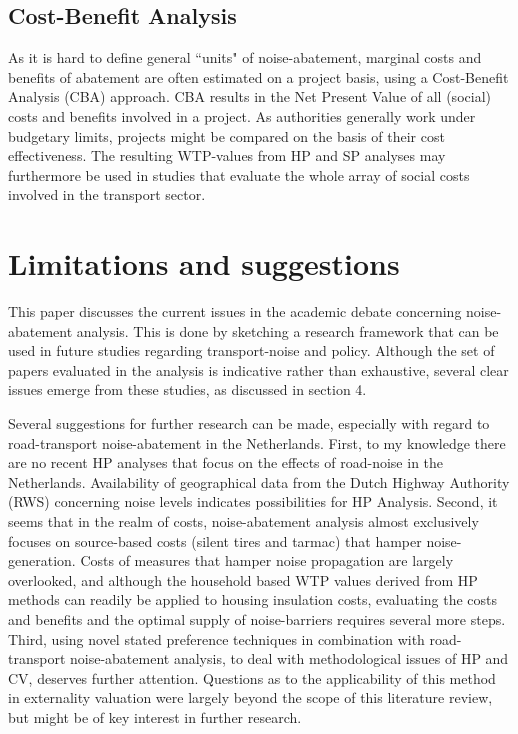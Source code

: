 \documentclass[a4paper]{scrartcl}
\begin{document}
\subsection{Cost-Benefit Analysis}

As it is hard to define general ``units" of noise-abatement, marginal costs and benefits of abatement are often estimated on a project basis, using a Cost-Benefit Analysis (CBA) approach. CBA results in the Net Present Value of all (social) costs and benefits involved in a project. As authorities generally work under budgetary limits, projects might be compared on the basis of their cost effectiveness. The resulting WTP-values from HP and SP analyses may furthermore be used in studies that evaluate the whole array of social costs involved in the transport sector.

\section{Limitations and suggestions}

This paper discusses the current issues in the academic debate concerning noise-abatement analysis. This is done by sketching a research framework that can be used in future studies regarding transport-noise and policy. Although the set of papers evaluated in the analysis is indicative rather than exhaustive, several clear issues emerge from these studies, as discussed in section 4.

Several suggestions for further research can be made, especially with regard to road-transport noise-abatement in the Netherlands. First, to my knowledge there are no recent HP analyses that focus on the effects of road-noise in the Netherlands. Availability of geographical data from the Dutch Highway Authority (RWS) concerning noise levels indicates possibilities for HP Analysis. Second, it seems that in the realm of costs, noise-abatement analysis almost exclusively focuses on source-based costs (silent tires and tarmac) that hamper noise-generation. Costs of measures that hamper noise propagation are largely overlooked, and although the household based WTP values derived from HP methods can readily be applied to housing insulation costs, evaluating the costs and benefits and the optimal supply of noise-barriers requires several more steps. Third, using novel stated preference techniques in combination with road-transport noise-abatement analysis, to deal with methodological issues of HP and CV, deserves further attention. Questions as to the applicability of this method in externality valuation were largely beyond the scope of this literature review, but might be of key interest in further research. 



\end{document}
